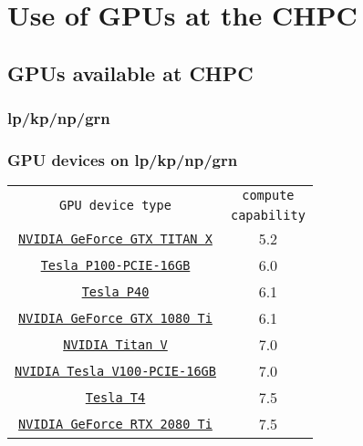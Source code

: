 \section{Use of GPUs at the CHPC}

\subsection{GPUs available at CHPC}

\subsubsection{lp/kp/np/grn}
\begin{frame}
        \frametitle{GPU devices on lp/kp/np/grn}
\begin{table}[H]
   \begin{center}
     \begin{tabular}{c|c}
        \multirow{2}{*}{\texttt{GPU device type}} & \texttt{compute} \\
                                                 & \texttt{capability} \\
        \hline
	  \href{https://www.nvidia.com/en-us/geforce/graphics-cards/geforce-gtx-titan-x/specifications/}{\small{\texttt{NVIDIA GeForce GTX TITAN X}}} & \small{5.2} \\
	  \href{https://images.nvidia.com/content/tesla/pdf/nvidia-tesla-p100-PCIe-datasheet.pdf}{\small{\texttt{Tesla P100-PCIE-16GB}}} & \small{6.0} \\
	  \href{https://www.nvidia.com/content/dam/en-zz/Solutions/design-visualization/documents/nvidia-p40-datasheet.pdf}{\small{\texttt{Tesla P40}}}& \small{6.1} \\
	  \href{https://www.nvidia.com/en-us/geforce/10-series/\#1080-ti-spec}{\small{\texttt{NVIDIA GeForce GTX 1080 Ti}}}    &  \small{6.1}  \\
	  \href{https://www.gpuzoo.com/GPU-NVIDIA/Titan\_V.html}{\small{\texttt{NVIDIA Titan V}}} & \small{7.0} \\  
	  \href{https://images.nvidia.com/content/technologies/volta/pdf/tesla-volta-v100-datasheet-letter-fnl-web.pdf}{\small{\texttt{NVIDIA Tesla V100-PCIE-16GB}}} & \small{7.0} \\
	  \href{https://www.nvidia.com/content/dam/en-zz/Solutions/Data-Center/tesla-t4/t4-tensor-core-product-brief.pdf}{\small{\texttt{Tesla T4}}} & \small{7.5} \\
	  \href{https://www.techpowerup.com/gpu-specs/geforce-rtx-2080-ti.c3305}{\small{\texttt{NVIDIA GeForce RTX 2080 Ti}}} & \small{7.5} \\   

\end{tabular}
\end{center}
\end{table}
\end{frame}
